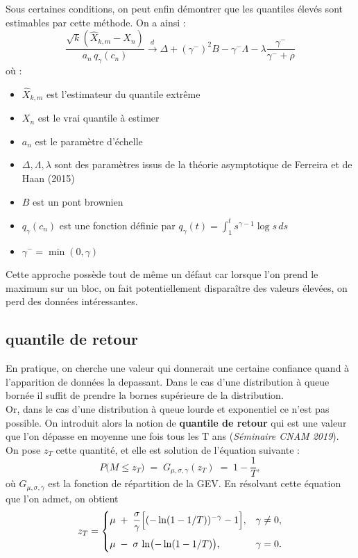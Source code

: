 \documentclass{article}
\theoremstyle{plain}
\theoremstyle{definition}
\theoremstyle{plain}
\begin{document}
\noindent Sous certaines conditions, on peut enfin démontrer que les quantiles élevés sont estimables par cette méthode. On a ainsi :
\[
\frac{\sqrt{k} \left( \hat{X}_{k,m} - X_n \right)}{a_n \, q_{\gamma}(c_n)}
\xrightarrow{d}
\Delta + (\gamma^-)^2 B - \gamma^- \Lambda - \lambda \frac{\gamma^-}{\gamma^- + \rho}
\]
où : \begin{itemize}
	\item $\hat{X}_{k,m}$ est l’estimateur du quantile extrême
	\item $X_n$ est le vrai quantile à estimer
	\item $a_n$ est le paramètre d'échelle
	\item $\Delta, \Lambda, \lambda$ sont des paramètres issus de la théorie asymptotique de Ferreira et de Haan (2015)
	\item $B$ est un pont brownien
	\item $q_{\gamma}(c_n)$ est une fonction définie par $q_{\gamma}(t) = \int_1^t s^{\gamma - 1} \log s \, ds$
	\item $\gamma^- = \min(0, \gamma)$
\end{itemize}
\vspace{0.5cm}
\noindent Cette approche possède tout de même un défaut car lorsque l'on prend le maximum sur un bloc, on fait potentiellement disparaître des valeurs élevées, on perd des données intéressantes.

\subsection{quantile de retour}

En pratique, on cherche une valeur qui donnerait une certaine confiance quand à l'apparition
de données la depassant. Dans le cas d'une distribution à queue bornée il suffit de prendre la bornes supérieure de la distribution.
\\
Or, dans le cas d'une distribution à queue lourde et exponentiel ce n'est pas possible. On introduit alors la notion de \textbf{quantile de retour} qui est une valeur que l'on dépasse en moyenne une fois tous les T ans (\textit{Séminaire CNAM 2019}).
\\
On pose $z_T$ cette quantité, et elle est solution de l'équation suivante :
\[
P\bigl(M \le z_T\bigr)
\;=\;
G_{\mu,\sigma,\gamma}(z_T)
\;=\;
1 - \frac{1}{T},
\]
où \(G_{\mu,\sigma,\gamma}\) est la fonction de répartition de la GEV. En résolvant cette équation que l'on admet, on obtient
\[
z_T =
\begin{cases}
\displaystyle
\mu \;+\;\frac{\sigma}{\gamma}\Bigl[(-\ln(1 - 1/T))^{-\gamma} - 1\Bigr],
&\gamma \neq 0,\\[1em]
\displaystyle
\mu \;-\;\sigma\,\ln\bigl(-\ln(1 - 1/T)\bigr),
&\gamma = 0.
\end{cases}
\]
\\
\\
\end{document}
